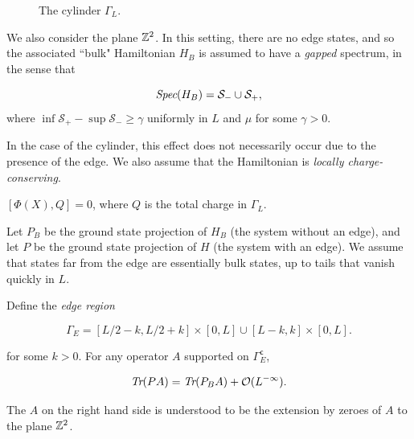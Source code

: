\documentclass[12pt, letterpaper]{article}
\begin{document}
\newpage
\begin{figure}[h!]
\centering
{}
\caption{The cylinder $\Gamma_L$.}
\label{fig:setup}
\end{figure}

We also consider the plane $\mathbb{Z}^2$. In this setting, there are no edge states, and so the associated ``bulk" Hamiltonian $H_B$ is assumed to have a \textit{gapped} spectrum, in the sense that

\begin{assumption}
\[\emph{Spec}(H_B) = \mathcal{S}_{-} \cup \mathcal{S}_{+},\]
where $\inf\mathcal{S}_{+} - \sup \mathcal{S}_{-} \geq \gamma$ uniformly in $L$ and $\mu$ for some $\gamma > 0$. 
\label{ass:gap}
\end{assumption}

In the case of the cylinder, this effect does not necessarily occur due to the presence of the edge. 
We also assume that the Hamiltonian is \emph{locally charge-conserving}.

\begin{assumption}
$[\Phi(X),Q] = 0$, where $Q$ is the total charge in $\Gamma_L$.
\label{ass:charge}
\end{assumption}

Let $P_B$ be the ground state projection of $H_B$ (the system without an edge), and let $P$ be the ground state projection of $H$ (the system with an edge). We assume that states far from the edge are essentially bulk states, up to tails that vanish quickly in $L$.

\begin{assumption}
Define the \emph{edge region }

\[\Gamma_E = [L/2-k,L/2+k]\times [0,L] \cup [L-k,k]\times [0,L].\]

for some $k>0$. For any operator $A$ supported on $\Gamma_E^\mathsf{c}$,

\[\emph{Tr}(PA) = \emph{Tr}(P_BA) + \mathcal{O}(L^{-\infty}).\]

The $A$ on the right hand side is understood to be the extension by zeroes of $A$ to the plane $\mathbb{Z}^2$.
\label{ass:bulk}
\end{assumption}
\end{document}
